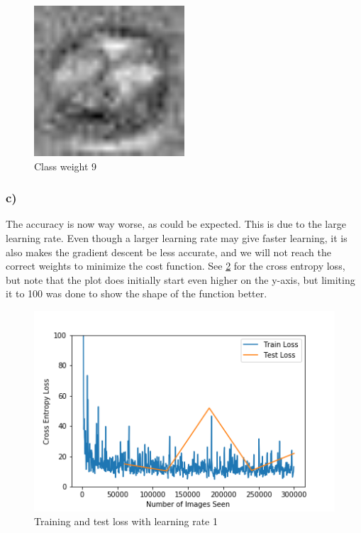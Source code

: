 \begin{figure}[]
    \centering
    \includegraphics[width=0.50\textwidth]{figures/weights/class_9_weight_image.jpg}
    \caption{Class weight 9}
    \label{fig:class_weight_9}
\end{figure}

\newpage

\subsubsection*{c)}
The accuracy is now way worse, as could be expected. This is due to the large learning rate. Even though a larger learning rate may give faster learning, it is also makes the gradient descent be less accurate, and we will not reach the correct weights to minimize the cost function. See \cref{fig:training_loss_learning_rate_1} for the cross entropy loss, but note that the plot does initially start even higher on the y-axis, but limiting it to 100 was done to show the shape of the function better. 

\begin{figure}[]
    \centering
    \includegraphics[width=1.00\textwidth]{figures/training/bad_learning_rate_training_loss.png}
    \caption{Training and test loss with learning rate 1}
    \label{fig:training_loss_learning_rate_1}
\end{figure}

